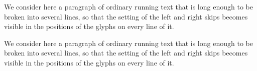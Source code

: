 \hsize=4in
{\narrower We consider here a paragraph of ordinary running text that is long enough to be broken into several lines, so that the setting of the left and right skips becomes visible in the positions of the glyphs on every line of it.\par}

We consider here a paragraph of ordinary running text that is long enough to be broken into several lines, so that the setting of the left and right skips becomes visible in the positions of the glyphs on every line of it.
\bye
